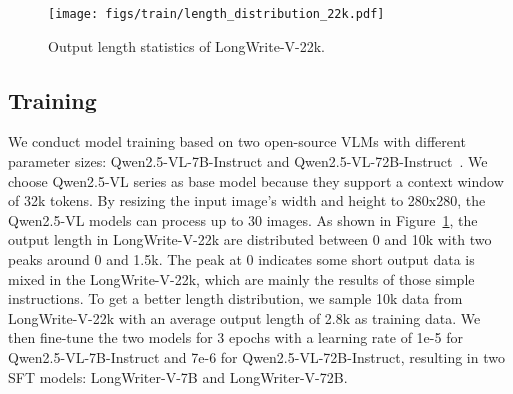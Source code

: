 \begin{figure}[t]
    \centering
    \texttt{[image: figs/train/length\_distribution\_22k.pdf]}
    \caption{Output length statistics of LongWrite-V-22k.}
    \label{fig:stats}
\end{figure}


\subsection{Training}
 We conduct model training based on two open-source VLMs with different parameter sizes: Qwen2.5-VL-7B-Instruct and Qwen2.5-VL-72B-Instruct~\cite{Qwen2.5-VL}. We choose Qwen2.5-VL series as base model because they support a context window of 32k tokens. By resizing the input image's width and height to 280x280, the Qwen2.5-VL models can process up to 30 images. As shown in Figure~\ref{fig:stats}, the output length in LongWrite-V-22k are distributed between 0 and 10k with two peaks around 0 and 1.5k. The peak at 0 indicates some short output data is mixed in the LongWrite-V-22k, which are mainly the results of those simple instructions. To get a better length distribution, we sample 10k data from LongWrite-V-22k with an average output length of 2.8k as training data. We then fine-tune the two models for 3 epochs with a learning rate of 1e-5 for Qwen2.5-VL-7B-Instruct and 7e-6 for Qwen2.5-VL-72B-Instruct, resulting in two SFT models: LongWriter-V-7B and LongWriter-V-72B.


